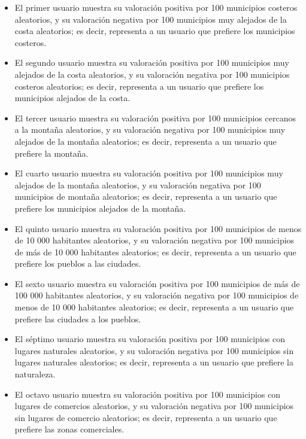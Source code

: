 \begin{itemize}
    \item El primer usuario muestra su valoración positiva por 100 municipios costeros aleatorios, y su valoración negativa por 100 municipios muy alejados de la costa aleatorios; es decir, representa a un usuario que prefiere los municipios costeros.

    \item El segundo usuario muestra su valoración positiva por 100 municipios muy alejados de la costa aleatorios, y su valoración negativa por 100 municipios costeros aleatorios; es decir, representa a un usuario que prefiere los municipios alejados de la costa.

    \item El tercer usuario muestra su valoración positiva por 100 municipios cercanos a la montaña aleatorios, y su valoración negativa por 100 municipios muy alejados de la montaña aleatorios; es decir, representa a un usuario que prefiere la montaña.
    
    \item El cuarto usuario muestra su valoración positiva por 100 municipios muy alejados de la montaña aleatorios, y su valoración negativa por 100 municipios de montaña aleatorios; es decir, representa a un usuario que prefiere los municipios alejados de la montaña.

    \item El quinto usuario muestra su valoración positiva por 100 municipios de menos de 10 000 habitantes aleatorios, y su valoración negativa por 100 municipios de más de 10 000 habitantes aleatorios; es decir, representa a un usuario que prefiere los pueblos a las ciudades.

    \item El sexto usuario muestra su valoración positiva por 100 municipios de más de 100 000 habitantes aleatorios, y su valoración negativa por 100 municipios de menos de 10 000 habitantes aleatorios; es decir, representa a un usuario que prefiere las ciudades a los pueblos.

    \item El séptimo usuario muestra su valoración positiva por 100 municipios con lugares naturales aleatorios, y su valoración negativa por 100 municipios sin lugares naturales aleatorios; es decir, representa a un usuario que prefiere la naturaleza.

    \item El octavo usuario muestra su valoración positiva por 100 municipios con lugares de comercios aleatorios, y su valoración negativa por 100 municipios sin lugares de comercio aleatorios; es decir, representa a un usuario que prefiere las zonas comerciales.


\end{itemize}
